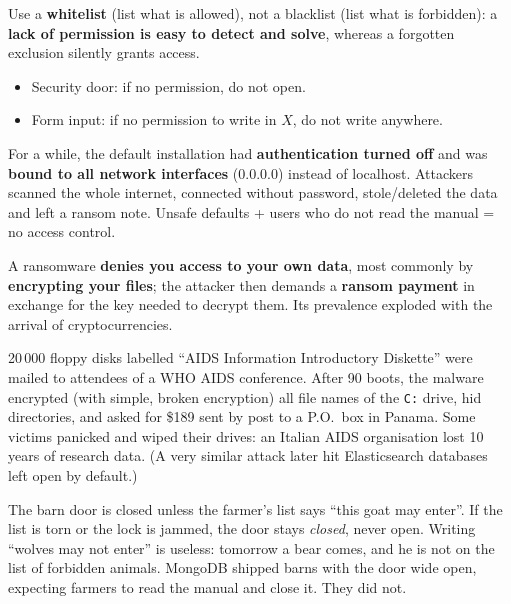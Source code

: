 \begin{propbox}[title={Whitelist, not blacklist}]
Use a \textbf{whitelist} (list what is allowed), not a blacklist (list what is
forbidden): a \textbf{lack of permission is easy to detect and solve}, whereas a
forgotten exclusion silently grants access.
\end{propbox}

\begin{exbox}[title=Fail-safe defaults]
\begin{itemize}
  \item Security door: if no permission, do not open.
  \item Form input: if no permission to write in $X$, do not write anywhere.
\end{itemize}
\end{exbox}

\begin{exbox}[title=MongoDB ransomware (2017) --- ease of use vs.\ security]
For a while, the default installation had \textbf{authentication turned off} and was
\textbf{bound to all network interfaces} (0.0.0.0) instead of localhost. Attackers
scanned the whole internet, connected without password, stole/deleted the data and left
a ransom note. Unsafe defaults + users who do not read the manual = no access control.
\end{exbox}

\begin{rembox}[title=Ransomware]
A ransomware \textbf{denies you access to your own data}, most commonly by
\textbf{encrypting your files}; the attacker then demands a \textbf{ransom payment} in
exchange for the key needed to decrypt them. Its prevalence exploded with the arrival of
cryptocurrencies.
\end{rembox}

\begin{exbox}[title={The first ransomware (1989)}]
20\,000 floppy disks labelled ``AIDS Information Introductory Diskette'' were mailed to attendees
of a WHO AIDS conference. After 90 boots, the malware encrypted (with simple, broken encryption)
all file names of the \texttt{C:} drive, hid directories, and asked for \$189 sent by post to a
P.O.\ box in Panama. Some victims panicked and wiped their drives: an Italian AIDS organisation
lost 10 years of research data. (A very similar attack later hit Elasticsearch databases left
open by default.)
\end{exbox}

\begin{goatbox}
The barn door is closed unless the farmer's list says ``this goat may enter''. If the list is
torn or the lock is jammed, the door stays \emph{closed}, never open. Writing ``wolves may not
enter'' is useless: tomorrow a bear comes, and he is not on the list of forbidden animals.
MongoDB shipped barns with the door wide open, expecting farmers to read the manual and close it.
They did not.
\end{goatbox}


